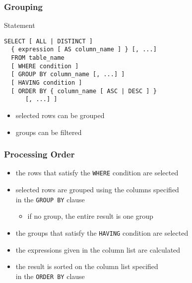 \documentclass[dvipsnames]{beamer}
\theoremstyle{plain}
\begin{document}
\begin{frame}[fragile]
  \frametitle{Grouping}

  \begin{block}{Statement}
    \begin{lstlisting}
SELECT [ ALL | DISTINCT ]
  { expression [ AS column_name ] } [, ...]
  FROM table_name
  [ WHERE condition ]
  [ GROUP BY column_name [, ...] ]
  [ HAVING condition ]
  [ ORDER BY { column_name [ ASC | DESC ] }
      [, ...] ]
    \end{lstlisting}
  \end{block}

  \pause
  \begin{itemize}
    \item selected rows can be grouped
    \item groups can be filtered
  \end{itemize}
\end{frame}

\begin{frame}
  \frametitle{Processing Order}

  \begin{itemize}
    \item the rows that satisfy the \lstinline!WHERE! condition are selected

    \pause
    \item selected rows are grouped using the columns specified\\
      in the \lstinline!GROUP BY! clause
    \begin{itemize}
      \item if no group, the entire result is one group
    \end{itemize}

    \pause
    \item the groups that satisfy the \lstinline!HAVING! condition are selected

    \pause
    \item the expressions given in the column list are calculated

    \pause
    \item the result is sorted on the column list specified\\
      in the \lstinline!ORDER BY! clause
  \end{itemize}
\end{frame}
\end{document}
